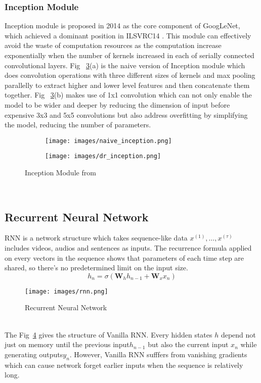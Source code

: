 \documentclass[a4paper, 11pt]{report}
\begin{document}
 \subsubsection{Inception Module}
Inception module is proposed in 2014 as the core component of GoogLeNet, which achieved a dominant position in ILSVRC14 \cite{szegedy2015going}. This module can effectively avoid the waste of computation resources as the computation increase exponentially when the number of kernels increased in each of serially connected convolutional layers. Fig ~\ref{fig:inception}(a) is the naive version of Inception module which does convolution operations with three different sizes of kernels and max pooling parallelly to extract higher and lower level features and then concatenate them together. Fig ~\ref{fig:inception}(b) makes use of 1x1 convolution which can not only enable the model to be wider and deeper by reducing the dimension of input before expensive 3x3 and 5x5 convolutions but also address overfitting by simplifying the model, reducing the number of parameters.
 \begin{figure}[h]
\begin{subfigure}{.5\textwidth}
  \centering
  \texttt{[image: images/naive\_inception.png]}
  \label{fig:naive}
\end{subfigure}%
\begin{subfigure}{.5\textwidth}
  \centering
  \texttt{[image: images/dr\_inception.png]}
  \label{fig:dr}
\end{subfigure}
\caption{Inception Module from \protect{}}
\label{fig:inception}
\end{figure}\\
\subsection{Recurrent Neural Network}
RNN is a network structure which takes sequence-like data $x^{(1)}, \ldots, x^{(\tau)}$ includes videos, audios and sentences as inputs. The recurrence formula applied on every vectors in the sequence shows that parameters of each time step are shared, so there's no predetermined limit on the input size. 
$$h_{n}=\sigma\left(\mathbf{W}_h h_{n-1}+\mathbf{W}_x x_{n}\right)$$
 \begin{figure}[h]
 	\caption{Recurrent Neural Network}
 	\centering
 	\texttt{[image: images/rnn.png]}
 	\label{fig:rnn}
 \end{figure}\\
The Fig~\ref{fig:rnn} gives the structure of Vanilla RNN. Every hidden states $h$ depend not just on memory until the previous input$h_{n-1}$ but also the current input $x_{n}$ while generating outputs$y_{n}$. However, Vanilla RNN sufffers from vanishing gradients which can cause network forget earlier inputs when the sequence is relatively long.\\
\end{document}
